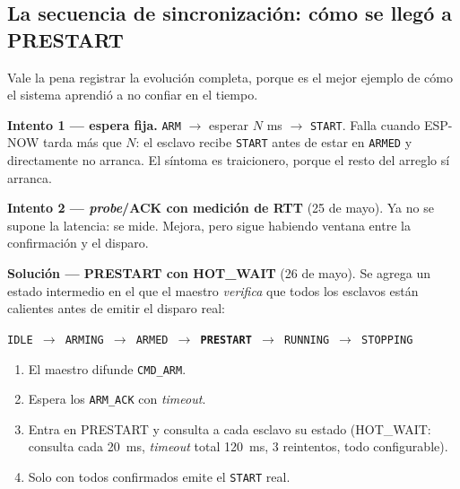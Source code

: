 
\subsection{La secuencia de sincronizaci\'on: c\'omo se lleg\'o a PRESTART}

Vale la pena registrar la evoluci\'on completa, porque es el mejor ejemplo de
c\'omo el sistema aprendi\'o a no confiar en el tiempo.

\textbf{Intento 1 --- espera fija.} \verb|ARM| $\to$ esperar $N$ ms $\to$
\verb|START|. Falla cuando ESP-NOW tarda m\'as que $N$: el esclavo recibe
\verb|START| antes de estar en \verb|ARMED| y directamente no arranca. El
s\'intoma es traicionero, porque el resto del arreglo s\'i arranca.

\textbf{Intento 2 --- \emph{probe}/ACK con medici\'on de RTT} (25 de mayo). Ya
no se supone la latencia: se mide. Mejora, pero sigue habiendo ventana entre
la confirmaci\'on y el disparo.

\textbf{Soluci\'on --- PRESTART con HOT\_WAIT} (26 de mayo). Se agrega un estado
intermedio en el que el maestro \emph{verifica} que todos los esclavos est\'an
calientes antes de emitir el disparo real:

\begin{center}\small
\texttt{IDLE $\to$ ARMING $\to$ ARMED $\to$ \textbf{PRESTART} $\to$ RUNNING $\to$ STOPPING}
\end{center}

\begin{enumerate}[itemsep=0.15em]
\item El maestro difunde \verb|CMD_ARM|.
\item Espera los \verb|ARM_ACK| con \emph{timeout}.
\item Entra en PRESTART y consulta a cada esclavo su estado (HOT\_WAIT:
consulta cada \SI{20}{\milli\second}, \emph{timeout} total
\SI{120}{\milli\second}, 3 reintentos, todo configurable).
\item Solo con todos confirmados emite el \verb|START| real.
\end{enumerate}


